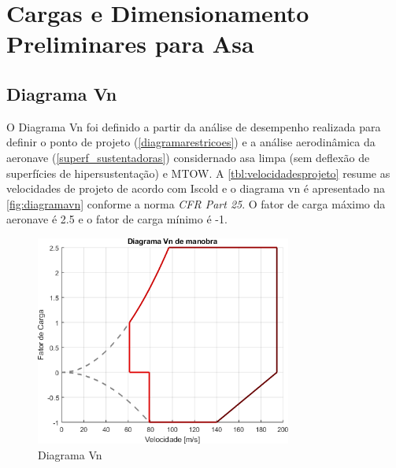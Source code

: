 \chapter{Cargas e Dimensionamento Preliminares para Asa}

\section{Diagrama Vn}
\label{diagramavn}

O Diagrama Vn foi definido a partir da análise de desempenho realizada para definir o ponto de projeto (\autoref{diagramarestricoes}) e a análise aerodinâmica da aeronave (\autoref{superf_sustentadoras}) considernado asa limpa (sem deflexão de superfícies de hipersustentação) e MTOW.
A \autoref{tbl:velocidadesprojeto} resume as velocidades de projeto de acordo com Iscold \cite{iscold} e o diagrama vn é apresentado na \autoref{fig:diagramavn} conforme a norma \textit{CFR Part 25}.
O fator de carga máximo da aeronave é 2.5 e o fator de carga mínimo é -1.

\begin{figure}[H]
\centering
\includegraphics[width=0.75\textwidth]{images/parte3/diagramavn_asalimpa.png}
\caption[Diagrama Vn]{Diagrama Vn}
\label{fig:diagramavn}
\end{figure}

